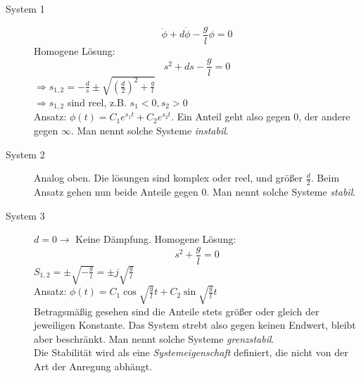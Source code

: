 \message{ !name(Mitschrieb_SysRegel.tex)}\documentclass[12pt,a4paper,ngerman]{scrartcl}
\begin{document}
\begin{description}
\item[System 1]
\[\ddot{\phi}+d\dot{\phi}-\frac{g}{l}\phi=0\]
Homogene Lösung:
\[
s^2+ds-\frac{g}{l}=0
\]
$\Rightarrow s_{1,2}=-\frac{d}{s}\pm \sqrt{(\frac{d}{2})^2+\frac{g}{l}}$\\
$\Rightarrow s_{1,2}$ sind reel, z.B. $s_1 < 0, s_2 >0$\\
Ansatz: $\phi(t)=C_1e^{s_1t}+C_2e^{s_2t}$. Ein Anteil geht also gegen 0, der andere gegen $\infty$. Man nennt solche Systeme \emph{instabil}.
\item[System 2] 
Analog oben. Die lösungen sind komplex oder reel, und größer $\frac{d}{2}$. Beim Ansatz gehen nun beide Anteile gegen 0. Man nennt solche Systeme \emph{stabil}.
\item[System 3] $d=0 \rightarrow $ Keine Dämpfung. Homogene Lösung:
\[
s^2+\frac{g}{l}=0
\] 
$S_{1,2}=\pm \sqrt{-\frac{g}{l}}=\pm j\sqrt{\frac{g}{l}}$\\
Ansatz: $\phi(t)=C_1\cos{\sqrt{\frac{g}{l}}t}+C_2\sin{\sqrt{\frac{g}{l}}t}$\\
Betragsmäßig gesehen sind die Anteile stets größer oder gleich der jeweiligen Konstante. Das System strebt also gegen keinen Endwert, bleibt aber beschränkt. Man nennt solche Systeme \emph{grenzstabil}.\\
Die Stabilität wird als eine \emph{Systemeigenschaft} definiert, die nicht von der Art der Anregung abhängt. 

\end{description}
\end{document}

